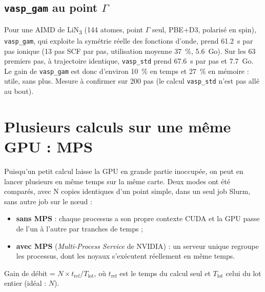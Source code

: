 \documentclass[11pt,a4paper]{article}
\begin{document}
\subsection{\texttt{vasp\_gam} au point $\Gamma$}

Pour une AIMD de LiN\textsubscript{3} (144 atomes, point $\Gamma$ seul, PBE+D3, polarisé en
spin), \texttt{vasp\_gam}, qui exploite la symétrie réelle des fonctions d'onde, prend
\SI{61,2}{s} par pas ionique (13 pas SCF par pas, utilisation moyenne \SI{37}{\percent},
\SI{5,6}{Go}). Sur les 63 premiers pas, à trajectoire identique, \texttt{vasp\_std} prend
\SI{67,6}{s} par pas et \SI{7,7}{Go}. Le gain de \texttt{vasp\_gam} est donc d'environ
\SI{10}{\percent} en temps et \SI{27}{\percent} en mémoire : utile, sans plus. Mesure à confirmer sur 200 pas (le calcul
\texttt{vasp\_std} n'est pas allé au bout).

\section{Plusieurs calculs sur une même GPU : MPS}
\label{sec:mps}

Puisqu'un petit calcul laisse la GPU en grande partie inoccupée, on peut en lancer plusieurs
en même temps sur la même carte. Deux modes ont été comparés, avec N copies identiques d'un
point simple, dans un seul job Slurm, sans autre job sur le nœud :
\begin{itemize}
  \item \textbf{sans MPS} : chaque processus a son propre contexte CUDA et la GPU passe de l'un
        à l'autre par tranches de temps ;
  \item \textbf{avec MPS} (\emph{Multi-Process Service} de NVIDIA) : un serveur unique regroupe
        les processus, dont les noyaux s'exécutent réellement en même temps.
\end{itemize}

Gain de débit = $N \times t_\text{ref} / T_\text{lot}$, où $t_\text{ref}$ est le temps du
calcul seul et $T_\text{lot}$ celui du lot entier (idéal : $N$).
\end{document}
